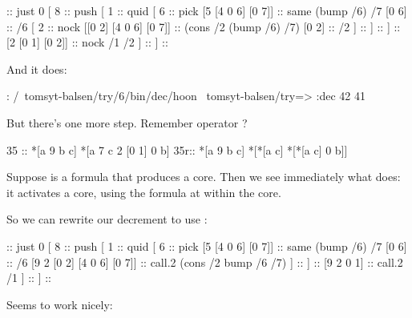 \begin{code}
[ 8                                          ::  push
  [1 0]                                      ::  just 0
  [ 8                                        ::  push
    [ 1                                      ::  quid
      [ 6                                    ::  pick
        [5 [4 0 6] [0 7]]                    ::  same (bump /6) /7
        [0 6]                                ::  /6
        [ 2                                  ::  nock
           [[0 2] [4 0 6] [0 7]]             ::  (cons /2 (bump /6) /7)
           [0 2]                             ::  /2
        ]                                    ::
      ]                                      ::
    ]                                        ::
    [2 [0 1] [0 2]]                          ::  nock /1 /2
  ]                                          ::
]                                            ::
\end{code}
And it does:

\begin{code}
: /~tomsyt-balsen/try/6/bin/dec/hoon
~tomsyt-balsen/try=> :dec 42
41
\end{code}
But there's one more step.  Remember operator ?

\begin{code}
35 ::    *[a 9 b c]       *[a 7 c 2 [0 1] 0 b]
35r::    *[a 9 b c]       *[*[a c] *[*[a c] 0 b]]
\end{code}
Suppose  is a formula that produces a core.  Then we see
immediately what  does: it activates a core, using the formula
at  within the core.

So we can rewrite our decrement to use :

\begin{code}
[ 8                                          ::  push
  [1 0]                                      ::  just 0
  [ 8                                        ::  push
    [ 1                                      ::  quid
      [ 6                                    ::  pick
        [5 [4 0 6] [0 7]]                    ::  same (bump /6) /7
        [0 6]                                ::  /6
        [9 2 [0 2] [4 0 6] [0 7]]            ::  call.2 (cons /2 bump /6 /7)
      ]                                      :: 
    ]                                        :: 
    [9 2 0 1]                                ::  call.2 /1
  ]                                          ::
]                                            :: 

\end{code}
Seems to work nicely:

